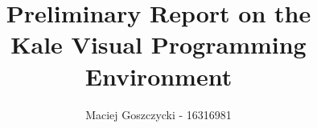 \documentclass[11pt]{report}
\title{Preliminary Report on the \\ Kale Visual Programming Environment}
\author{Maciej Goszczycki - 16316981}
\date{\versionBox}
\begin{document}


\maketitle
\tableofcontents
\clearpage
{}
\setcounter{page}{1}

\setlength\intextsep{0pt}

\DefineShortVerb{\|}



















\renewcommand*{\bibfont}{\raggedright}

\clearpage


\begin{appendices}
	
	
	
\end{appendices}
\end{document}
